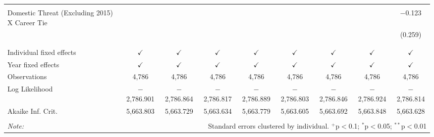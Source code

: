 \documentclass[12pt,letterpaper]{article}
\begin{document}
\begin{table}[!htbp]
\begin{tabular}{@{\extracolsep{5pt}}lcccccccc}
		& & & & & & & & \\ 
		Domestic Threat (Excluding 2015) X Career Tie &  &  &  &  &  &  &  & $-$0.123 \\ 
		&  &  &  &  &  &  &  & (0.259) \\ 
		& & & & & & & & \\ 
		\hline \\[-1.8ex] 
		Individual fixed effects & $\checkmark$ & $\checkmark$ & $\checkmark$ & $\checkmark$ & $\checkmark$ & $\checkmark$ & $\checkmark$ & $\checkmark$ \\ 
		Year fixed effects & $\checkmark$ & $\checkmark$ & $\checkmark$ & $\checkmark$ & $\checkmark$ & $\checkmark$ & $\checkmark$ & $\checkmark$ \\ 
		Observations & 4,786 & 4,786 & 4,786 & 4,786 & 4,786 & 4,786 & 4,786 & 4,786 \\ 
		Log Likelihood & $-$2,786.901 & $-$2,786.864 & $-$2,786.817 & $-$2,786.889 & $-$2,786.803 & $-$2,786.846 & $-$2,786.924 & $-$2,786.814 \\ 
		Akaike Inf. Crit. & 5,663.803 & 5,663.729 & 5,663.634 & 5,663.779 & 5,663.605 & 5,663.692 & 5,663.848 & 5,663.628 \\ 
		\hline 
		\hline \\[-1.8ex] 
		\textit{Note:}  & \multicolumn{8}{r}{Standard errors clustered by individual. $^{+}$p$<$0.1; $^{*}$p$<$0.05; $^{**}$p$<$0.01}} \\ 
\end{tabular} 
\end{table} 
\end{document}
